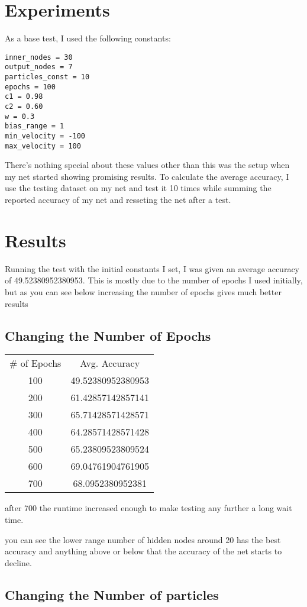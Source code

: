 \documentclass[letterpaper]{article}
\begin{document}
\section{Experiments}
As a base test, I used the following constants:
\begin{lstlisting}
inner_nodes = 30
output_nodes = 7
particles_const = 10
epochs = 100
c1 = 0.98
c2 = 0.60
w = 0.3
bias_range = 1
min_velocity = -100
max_velocity = 100
\end{lstlisting}
There's nothing special about these values other than this was the setup when my net started showing promising results. To calculate the average accuracy, I use the testing dataset on my net and test it 10 times while summing the reported accuracy of my net and resseting the net after a test.  

\section{Results} 
Running the test with the initial constants I set, I was given an average accuracy of 49.52380952380953. This is mostly due to the number of epochs I used initially, but as you can see below increasing the number of epochs gives much better results

\subsection{Changing the Number of Epochs}
\begin{center}
\begin{tabular}{ |c| |c| }
\# of Epochs & Avg. Accuracy\\
100 & 49.52380952380953 \\
200 & 61.42857142857141 \\
300   &  65.71428571428571 \\
400 & 64.28571428571428 \\
500 & 65.23809523809524 \\
600 & 69.04761904761905 \\
700 & 68.0952380952381 
\end{tabular}
\end{center}
after 700 the runtime increased enough to make testing any further a long wait time.


you can see the lower range number of hidden nodes around 20 has the best accuracy and anything above or below that the accuracy of the net starts to decline.


\subsection{Changing the Number of particles}
\end{document}
